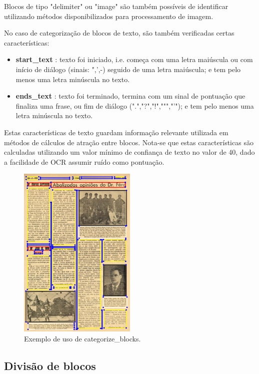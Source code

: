 Blocos de tipo "delimiter" ou "image" são também possíveis de identificar utilizando métodos disponibilizados para processamento de imagem.

No caso de categorização de blocos de texto, são também verificadas certas características:
\begin{itemize}\setlength\itemsep{-0.3em}
	\item \textbf{start\_text} : texto foi iniciado, i.e. começa com uma letra maiúscula ou com início de diálogo (sinais: ",',-) seguido de uma letra maiúscula; e tem pelo menos uma letra minúscula no texto.
	\item \textbf{ends\_text} : texto foi terminado, termina com um sinal de pontuação que finaliza uma frase, ou fim de diálogo (".","?","!",""","'"); e tem pelo menos uma letra minúscula no texto.
\end{itemize}

Estas características de texto guardam informação relevante utilizada em métodos de cálculos de atração entre blocos. Nota-se que estas características são calculadas utilizando um valor mínimo de confiança de texto no valor de 40, dado a facilidade de OCR assumir ruído como pontuação.



\begin{figure}[H]
	\centering
	\includegraphics[width=0.5\textwidth]{images/ilustracoes/categorize_blocks.png}
	\caption{Exemplo de uso de categorize\_blocks.}
	\label{fig:categorize_blocks}
\end{figure}



\subsection{Divisão de blocos}
\label{contribution_divide_blocks}

